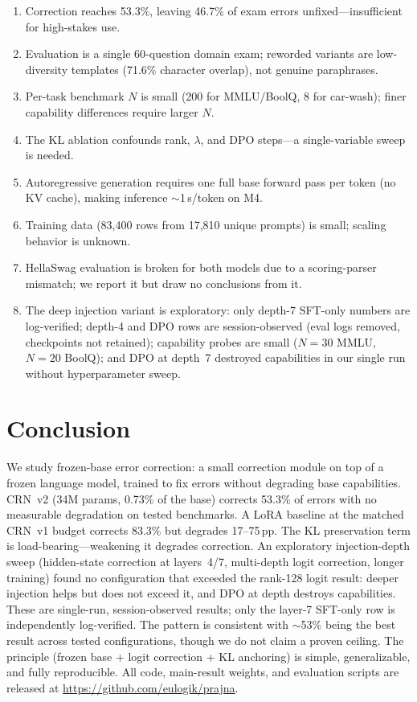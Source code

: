 \documentclass[11pt]{article}
\begin{document}
\begin{enumerate}[leftmargin=1.2em, itemsep=0.15em]
\item Correction reaches 53.3\%, leaving 46.7\% of exam errors unfixed---insufficient for high-stakes use.
\item Evaluation is a single 60-question domain exam; reworded variants are low-diversity templates (71.6\% character overlap), not genuine paraphrases.
\item Per-task benchmark $N$ is small (200 for MMLU/BoolQ, 8 for car-wash); finer capability differences require larger $N$.
\item The KL ablation confounds rank, $\lambda$, and DPO steps---a single-variable sweep is needed.
\item Autoregressive generation requires one full base forward pass per token (no KV cache), making inference $\sim$1\,s/token on M4.
\item Training data (83{,}400 rows from 17{,}810 unique prompts) is small; scaling behavior is unknown.
\item HellaSwag evaluation is broken for both models due to a scoring-parser mismatch; we report it but draw no conclusions from it.
\item The deep injection variant is exploratory: only depth-7 SFT-only numbers are log-verified; depth-4 and DPO rows are session-observed (eval logs removed, checkpoints not retained); capability probes are small ($N{=}30$ MMLU, $N{=}20$ BoolQ); and DPO at depth~7 destroyed capabilities in our single run without hyperparameter sweep.
\end{enumerate}

\section{Conclusion}

We study frozen-base error correction: a small correction module on top of a frozen language model, trained to fix errors without degrading base capabilities.
CRN~v2 (34M params, 0.73\% of the base) corrects 53.3\% of errors with no measurable degradation on tested benchmarks.
A LoRA baseline at the matched CRN~v1 budget corrects 83.3\% but degrades 17--75\,pp.
The KL preservation term is load-bearing---weakening it degrades correction.
An exploratory injection-depth sweep (hidden-state correction at layers~4/7, multi-depth logit correction, longer training) found no configuration that exceeded the rank-128 logit result: deeper injection helps but does not exceed it, and DPO at depth destroys capabilities. These are single-run, session-observed results; only the layer-7 SFT-only row is independently log-verified. The pattern is consistent with $\sim$53\% being the best result across tested configurations, though we do not claim a proven ceiling.
The principle (frozen base + logit correction + KL anchoring) is simple, generalizable, and fully reproducible.
All code, main-result weights, and evaluation scripts are released at \url{https://github.com/eulogik/prajna}.
\end{document}
